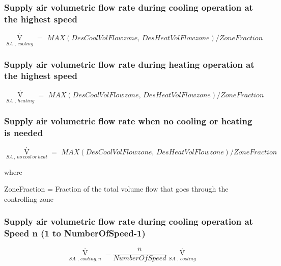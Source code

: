 \subsubsection{Supply air volumetric flow rate during cooling operation at the highest speed}\label{supply-air-volumetric-flow-rate-during-cooling-operation-at-the-highest-speed}

\begin{equation}
{\mathop V\limits^ \cdot_{SA\,\,,\,cooling}} = \,\,MAX(DesCoolVolFlowzone,\,DesHeatVolFlowzone)/ZoneFraction
\end{equation}

\subsubsection{Supply air volumetric flow rate during heating operation at the highest speed}\label{supply-air-volumetric-flow-rate-during-heating-operation-at-the-highest-speed}

\begin{equation}
{\mathop V\limits^ \cdot_{SA\,\,,\,heating}} = \,\,MAX(DesCoolVolFlowzone,\,DesHeatVolFlowzone)/ZoneFraction
\end{equation}

\subsubsection{Supply air volumetric flow rate when no cooling or heating is needed}\label{supply-air-volumetric-flow-rate-when-no-cooling-or-heating-is-needed-1}

\begin{equation}
{\mathop V\limits^ \cdot_{SA\,,\,no\,cool\,or\,heat}} = \,\,MAX(DesCoolVolFlowzone,\,DesHeatVolFlowzone)/ZoneFraction
\end{equation}

where

ZoneFraction = Fraction of the total volume flow that goes through the controlling zone

\subsubsection{Supply air volumetric flow rate during cooling operation at Speed n (1 to NumberOfSpeed-1)}\label{supply-air-volumetric-flow-rate-during-cooling-operation-at-speed-n-1-to-numberofspeed-1}

\begin{equation}
{\mathop V\limits^ \cdot_{SA\,\,,\,cooling,n}} = \frac{n}{{NumberOfSpeed}}{\mathop V\limits^ \cdot_{SA\,\,,\,cooling}}
\end{equation}

